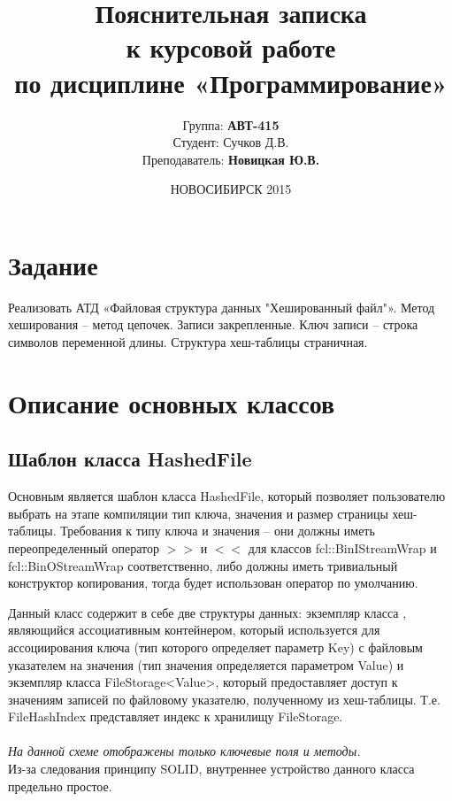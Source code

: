 \documentclass[12pt, a4paper]{fallen_report}
\author{
    Группа: \textbf{АВТ-415}\\
    Студент: Сучков Д.В.\\
    Преподаватель: \textbf{Новицкая Ю.В.}
}
\date{
    НОВОСИБИРСК 2015
}
\title{
    Пояснительная записка\\к курсовой работе\\по дисциплине «Программирование»
}
\begin{document}
\maketitle
\tableofcontents
\pagebreak

\section{Задание}
Реализовать АТД «Файловая структура данных "Хешированный файл"». Метод хеширования – метод цепочек. Записи закрепленные. Ключ записи – строка символов переменной длины. Структура хеш-таблицы страничная.

\pagebreak
\section{Описание основных классов}
\subsection{Шаблон класса HashedFile}
\par Основным является шаблон класса {\consolas HashedFile}, который позволяет пользователю выбрать на этапе компиляции тип ключа, значения и размер страницы хеш-таблицы. Требования к типу ключа и значения – они должны иметь переопределенный оператор $>>$ и $<<$ для классов {\consolas fcl::BinIStreamWrap} и {\consolas fcl::BinOStreamWrap} соответственно, либо должны иметь тривиальный конструктор копирования, тогда будет использован оператор по умолчанию.

Данный класс содержит в себе две структуры данных: экземпляр класса , являющийся ассоциативным контейнером, который используется для ассоциирования ключа (тип которого определяет параметр {\consolas Key}) с файловым указателем на значения (тип значения определяется параметром {\consolas Value}) и экземпляр класса {\consolas FileStorage<Value>}, который предоставляет доступ к значениям записей по файловому указателю, полученному из хеш-таблицы. Т.е. {\consolas FileHashIndex} представляет индекс к хранилищу {\consolas FileStorage}.\\

{ \consolas\scriptsize\hskip -40pt }\\
\textit{\small На данной схеме отображены только ключевые поля и методы.}\\
Из-за следования принципу SOLID, внутреннее устройство данного класса предельно простое.
\pagebreak
\end{document}
